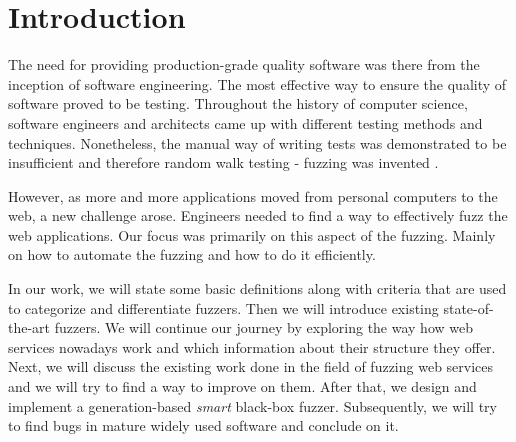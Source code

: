 \chapter{Introduction}
The need for providing production-grade quality software was there from the inception of software engineering. The most effective way to ensure the quality of software proved to be testing. Throughout the history of computer science, software engineers and architects came up with different testing methods and techniques. Nonetheless, the manual way of writing tests was demonstrated to be insufficient and therefore random walk testing - fuzzing was invented \cite{miller1990empirical}.

However, as more and more applications moved from personal computers to the web, a new challenge arose. Engineers needed to find a way to effectively fuzz the web applications. Our focus was primarily on this aspect of the fuzzing. Mainly on how to automate the fuzzing and how to do it efficiently.

In our work, we will state some basic definitions along with criteria that are used to categorize and differentiate fuzzers. Then we will introduce existing state-of-the-art fuzzers. We will continue our journey by exploring the way how web services nowadays work and which information about their structure they offer. Next, we will discuss the existing work done in the field of fuzzing web services and we will try to find a way to improve on them. After that, we design and implement a generation-based \textit{smart} black-box fuzzer. Subsequently, we will try to find bugs in mature widely used software and conclude on it.
